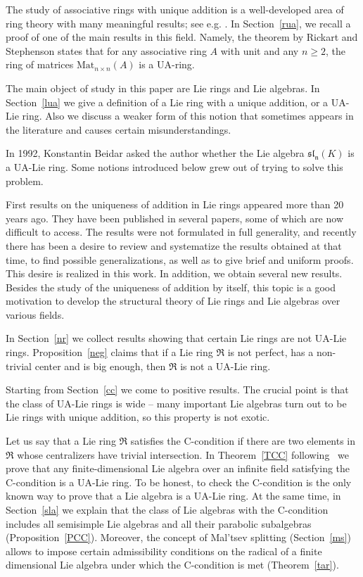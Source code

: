 \documentclass[a4paper,draft,reqno,12pt]{amsart}
\theoremstyle{definition}
\theoremstyle{remark}
\def\RRR{\mathfrak{R}}
\renewcommand{\ge}{\geqslant}
\begin{document}
The study of associative rings with unique addition is a well-developed area of ring theory with many meaningful results; see e.g. \cite{Jo,Mar,Mi,Ri,St}. In Section~\ref{rua}, we recall a proof of one of the main results in this field. Namely, the theorem by Rickart and Stephenson states that for any associative ring $A$ with unit and any $n\ge 2$, the ring of matrices $\text{Mat}_{n\times n}(A)$  is a UA-ring.

The main object of study in this paper are Lie rings and Lie algebras. In Section~\ref{lua} we give a definition of a Lie ring with a unique addition, or a UA-Lie ring. Also we discuss a weaker form of this notion that sometimes appears in the literature and causes certain misunderstandings. 

In 1992, Konstantin Beidar asked the author whether the Lie algebra $\mathfrak{sl_n}(K)$ is a UA-Lie ring.  Some notions introduced below grew out of trying to solve this problem.

First results on the uniqueness of addition in Lie rings appeared more than 20 years ago. They have been published in several papers, some of which are now difficult to access. The results were not formulated in full generality, and recently there has been a desire to review and systematize the results obtained at that time, to find possible generalizations, as well as to give brief and uniform proofs. This desire is realized in this work. In addition, we obtain several new results. Besides the study of the uniqueness of addition by itself, this topic is a good motivation to develop the structural theory of Lie rings and Lie algebras over various fields.

In Section~\ref{nr} we collect results showing that certain Lie rings are not UA-Lie rings. Proposition~\ref{neg} claims that if a Lie ring $\RRR$ is not perfect, has a non-trivial center and is big enough, then $\RRR$ is not a UA-Lie ring. 

Starting from Section~\ref{cc} we come to positive results. The crucial point is that the class of UA-Lie rings is wide -- many important Lie algebras turn out to be Lie rings with unique addition, so this property is not exotic. 

Let us say that a Lie ring $\RRR$ satisfies the C-condition if there are two elements in $\RRR$ whose centralizers have trivial intersection. In Theorem~\ref{TCC} following~\cite{A4} we prove
that any finite-dimensional Lie algebra over an infinite field satisfying the C-condition is a UA-Lie ring. To be honest, to check the C-condition is the only known way to prove that a Lie algebra is a UA-Lie ring. At the same time,  in Section~\ref{sla}  we explain that the class of Lie algebras with the C-condition includes all semisimple Lie algebras and all their parabolic subalgebras (Proposition~\ref{PCC}). Moreover, the concept of Mal'tsev splitting (Section~\ref{ms}) allows to impose certain admissibility conditions on the radical of a finite dimensional Lie algebra under which the C-condition is met (Theorem~\ref{tar}). 
\end{document}
